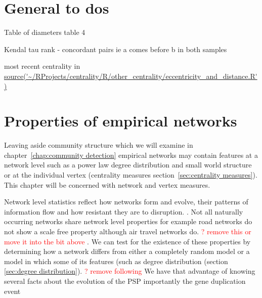 \section{General to dos}

Table of diameters \cite{crescenzi2013computing}
 table 4 

Kendal tau rank - concordant pairs ie a comes before b in both samples 

most recent centrality in \url{source('~/RProjects/centrality/R/other_centrality/eccentricity_and_distance.R')}



\section{Properties of empirical networks}
\label{sec:Properties of empirical networks}
Leaving aside community structure which we will examine in chapter~\ref{chap:community detection} empirical networks may contain features at a network level such as a power law degree distribution \cite{barabasi1999emergence} \cite{barabasi1999mean} and small world structure \cite{watts1998collective} or at the individual vertex (centrality measures section~\ref{sec:centrality measures}). This chapter will be concerned with network and vertex measures. 

Network level statistics reflect how networks form and evolve, their patterns of information flow and how resistant they are to disruption.
.
Not all naturally occurring networks share network level properties for example road networks do not show a scale free property although air travel networks do.
\textcolor{red}{? remove this or move it into the bit above}
.
We can test for the existence of these properties by determining how a network differs from either a completely random model or a model in which some of its features (such as degree distribution (section \ref{sec:degree distribution}). \textcolor{red}{? remove following} We have that advantage of knowing several facts about the evolution of the PSP importantly the gene duplication event \cite{grant2016molecular} 

